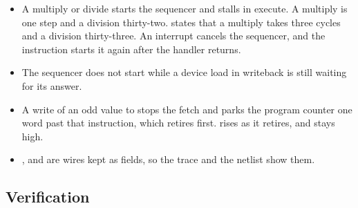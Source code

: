 \begin{itemize}
the timer's, cause .
\item A multiply or divide starts the sequencer and stalls in execute.
A multiply is one step and a division thirty-two. 
states that a multiply takes three cycles and a division thirty-three.
An interrupt cancels the sequencer, and the instruction starts it
again after the handler returns.
\item The sequencer does not start while a device load in writeback is
still waiting for its answer.
\item A write of an odd value to  stops the fetch and
parks the program counter one word past that instruction, which
retires first.  rises as it retires, and stays high.
\item {},  and  are wires kept
as fields, so the trace and the netlist show them.
\end{itemize}

\subsection*{Verification}

